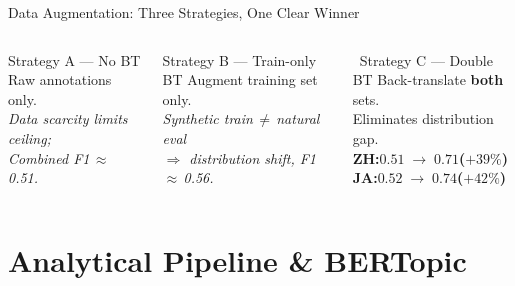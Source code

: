 \documentclass[aspectratio=169,10pt]{beamer}
\newcommand{\faCheckCircle}{\ding{52}}
\newcommand{\highlight}[1]{{\color{accent}\textbf{#1}}}
\begin{document}
\begin{frame}{Data Augmentation: Three Strategies, One Clear Winner}
\begin{columns}[T]
      \vspace{4pt}

      \begin{block}{Strategy A --- No BT}
        \small Raw annotations only.\\[1pt]
        \textit{Data scarcity limits ceiling;\\
        Combined F1\,$\approx$\,0.51.}
      \end{block}

      \begin{block}{Strategy B --- Train-only BT}
        \small Augment training set only.\\[1pt]
        \textit{Synthetic train\,$\neq$\,natural eval\\
        $\Rightarrow$ distribution shift, F1\,$\approx$\,0.56.}
      \end{block}

      \begin{alertblock}{\faCheckCircle~Strategy C --- Double BT}
        \small Back-translate \textbf{both} sets.\\
        Eliminates distribution gap.\\[5pt]
        \highlight{ZH:\;$0.51\;\to\;0.71$\;({\color{green!60!black}$+39\%$})}\\[2pt]
        \highlight{JA:\;$0.52\;\to\;0.74$\;({\color{green!60!black}$+42\%$})}
      \end{alertblock}

  \end{columns}
\end{frame}

\section{Analytical Pipeline \& BERTopic}
\end{document}
